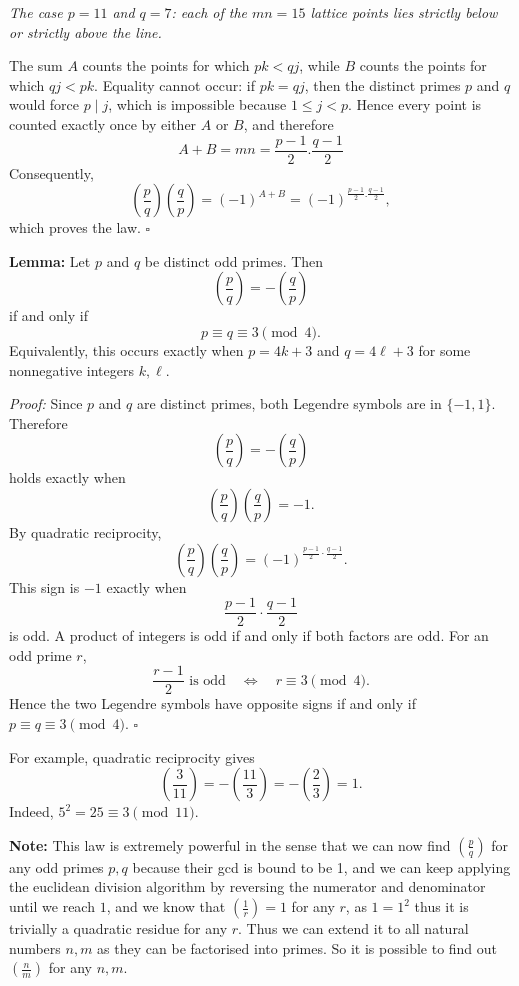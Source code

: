\documentclass[a4paper,11pt,abstracton]{scrartcl}
\theoremstyle{dotlessP}
\theoremstyle{dotlessS}
\theoremstyle{remark}
\theoremstyle{definition}
\begin{document}
\begin{claim_box}
\begin{center}
\textit{The case $p=11$ and $q=7$: each of the $mn=15$ lattice
points lies strictly below or strictly above the line.}
\end{center}

The sum $A$ counts the points for which $pk<qj$, while $B$ counts
the points for which $qj<pk$. Equality cannot occur: if $pk=qj$,
then the distinct primes $p$ and $q$ would force $p\mid j$, which is
impossible because $1\leq j<p$. Hence every point is counted exactly
once by either $A$ or $B$, and therefore
\[
    A+B=mn=\frac{p-1}{2}.\frac{q-1}{2}
    \]
Consequently,
\[
    \left(\frac pq\right)\left(\frac qp\right)
      =(-1)^{A+B}
      =(-1)^{\frac{p-1}{2}.\frac{q-1}{2}},
\]
which proves the law.
\hfill$\square$
\end{claim_box}

\begin{remark_box}
\textbf{Lemma:}
Let $p$ and $q$ be distinct odd primes. Then
\[
    \boxed{\left(\frac pq\right)=-\left(\frac qp\right)}
\]
if and only if
\[
    p\equiv q\equiv3\pmod4.
\]
Equivalently, this occurs exactly when
$p=4k+3$ and $q=4\ell+3$ for some nonnegative integers $k,\ell$.
\end{remark_box}

\begin{claim_box}
\textit{Proof:}
Since $p$ and $q$ are distinct primes, both Legendre symbols are in
$\{-1,1\}$. Therefore
\[
    \left(\frac pq\right)=-\left(\frac qp\right)
\]
holds exactly when
\[
    \left(\frac pq\right)\left(\frac qp\right)=-1.
\]
By quadratic reciprocity,
\[
    \left(\frac pq\right)\left(\frac qp\right)
      =(-1)^{\frac{p-1}{2}\cdot\frac{q-1}{2}}.
\]
This sign is $-1$ exactly when
\[
    \frac{p-1}{2}\cdot\frac{q-1}{2}
\]
is odd. A product of integers is odd if and only if both factors are
odd. For an odd prime $r$,
\[
    \frac{r-1}{2}\text{ is odd}
      \quad\Longleftrightarrow\quad r\equiv3\pmod4.
\]
Hence the two Legendre symbols have opposite signs if and only if
$p\equiv q\equiv3\pmod4$.
\hfill$\square$
\end{claim_box}

\begin{example_box}
For example, quadratic reciprocity gives
\[
    \left(\frac{3}{11}\right)
      =-\left(\frac{11}{3}\right)
      =-\left(\frac{2}{3}\right)=1.
\]
Indeed, $5^2=25\equiv3\pmod{11}$.
\end{example_box}

\textbf{Note:} This law is extremely powerful in the sense that we can now find $(\frac{p}{q})$ for any odd primes $p,q$ because their gcd is bound to be 1, and we can keep applying the euclidean division algorithm by reversing the numerator and denominator until we reach $1$, and we know that $(\frac{1}{r})=1$ for any $r$, as $1=1^2$ thus it is trivially a quadratic residue for any $r$. Thus we can extend it to all natural numbers $n,m$ as they can be factorised into primes. So it is possible to find out $(\frac{n}{m})$ for any $n,m$.
\end{document}
